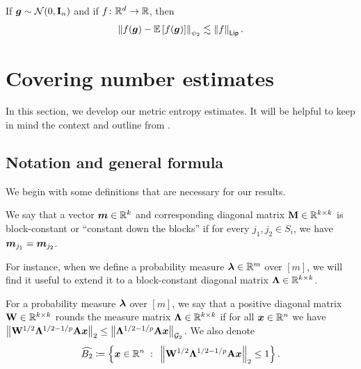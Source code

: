 \documentclass[11pt]{article}
\numberwithin{equation}{section}
\begin{document}
\begin{fact}
\label{fact:lip_concentration}
If $\bm{g} \sim \mathcal{N}(0,\mathbf{I}_n)$ and if $f\colon\mathbb{R}^d\rightarrow\mathbb{R}$, then
\begin{align*}
    \left\lVert f(\bm{g}) - \mathbb{E}\left[f(\bm{g})\right] \right\rVert_{\psi_2} \lesssim \left\lVert f \right\rVert_{\mathsf{Lip}}.
\end{align*}
\end{fact}

\section{Covering number estimates}
\label{sec:coverings}

In this section, we develop our metric entropy estimates. It will be helpful to keep in mind the context and outline from .

\subsection{Notation and general formula}

We begin with some definitions that are necessary for our results.

\begin{definition}
\label{defn:block_constant}
We say that a vector $\bm{m} \in \mathbb{R}^k$ and corresponding diagonal matrix $\mathbf{M}\in\mathbb{R}^{k\times k}$ is block-constant or ``constant down the blocks'' if for every $j_1,j_2 \in S_i$, we have $\bm{m}_{j_1}=\bm{m}_{j_2}$.
\end{definition}

For instance, when we define a probability measure $\bm{\lambda} \in \mathbb{R}^{m}$ over $[m]$, we will find it useful to extend it to a block-constant diagonal matrix $\mathbf{\Lambda}\in\mathbb{R}^{k \times k}$.

\begin{definition}
\label{defn:rounding_matrix}
For a probability measure $\bm{\lambda}$ over $[m]$, we say that a positive diagonal matrix $\mathbf{W} \in \mathbb{R}^{k \times k}$ rounds the measure matrix $\mathbf{\Lambda} \in \mathbb{R}^{k\times k}$ if for all $\bm{x}\in\mathbb{R}^n$ we have $\left\lVert \mathbf{W}^{1/2}\mathbf{\Lambda}^{1/2-1/p}\mathbf{A}\bm{x} \right\rVert_2 \le \left\lVert \mathbf{\Lambda}^{1/2-1/p}\mathbf{A}\bm{x} \right\rVert_{\mathcal{G}_{2}}$. We also denote
\begin{align*}
    \widehat{B_2} \coloneqq \left\{\bm{x}\in\mathbb{R}^n {\;\; : \;\;} \left\lVert \mathbf{W}^{1/2}\mathbf{\Lambda}^{1/2-1/p}\mathbf{A}\bm{x} \right\rVert_2 \le 1\right\}.
\end{align*}
\end{definition}
\end{document}
